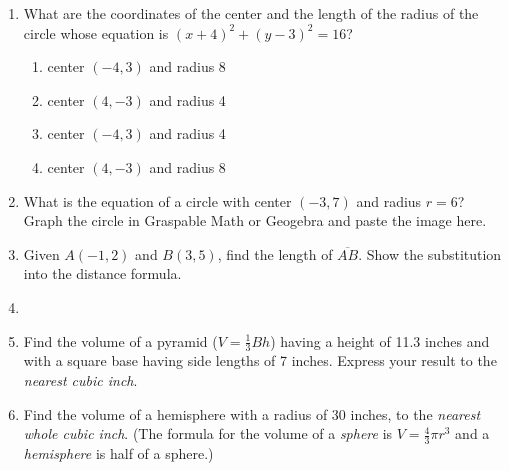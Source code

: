 \documentclass[12pt, twoside]{article}
\begin{document}
\begin{enumerate}
\newpage
\item What are the coordinates of the center and the length of the radius of the circle whose equation is $(x+4)^2+(y-3)^2=16$?
    \begin{enumerate}
      \item center $(-4,3)$ and radius 8
      \item center $(4,-3)$ and radius 4
      \item center $(-4,3)$ and radius 4
      \item center $(4,-3)$ and radius 8
    \end{enumerate}

\newpage
\item What is the equation of a circle with center $(-3,7)$ and radius $r=6$?\\[0.5cm]
  Graph the circle in Graspable Math or Geogebra and paste the image here.

\newpage
\item Given $A(-1,2)$ and $B(3,5)$, find the length of $\overline{AB}$. Show the substitution into the distance formula.
\item %
      
\newpage
\item Find the volume of a pyramid ($V=\frac{1}{3}Bh$) having a height of 11.3 inches and with a square base having side lengths of 7 inches. Express your result to the \emph{nearest cubic inch}. \vspace{5cm}

\newpage
\item Find the volume of a hemisphere with a radius of 30 inches, to the \emph{nearest whole cubic inch}. (The formula for the volume of a \emph{sphere} is $V=\frac{4}{3}\pi r^3$ and a \emph{hemisphere} is half of a sphere.) \vspace{5cm}

\end{enumerate}
\end{document}
